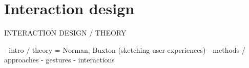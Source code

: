 

\section{Interaction design}
INTERACTION DESIGN / THEORY

- intro / theory = Norman, Buxton (sketching user experiences)
- methods / approaches
- gestures
- interactions
